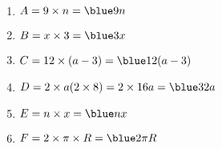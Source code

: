    \ \\ [-5mm]
   \begin{enumerate}
      \item $A =9\times n =\blue9n$
      \item $B =x\times3 =\blue3x$
      \item $C =12\times(a-3) =\blue12(a-3)$
      \item $D =2\times a(2\times8) =2\times16a =\blue32a$
      \item $E =n\times x =\blue nx$
      \item $F =2\times\pi\times R =\blue2\pi R$
\end{enumerate}

